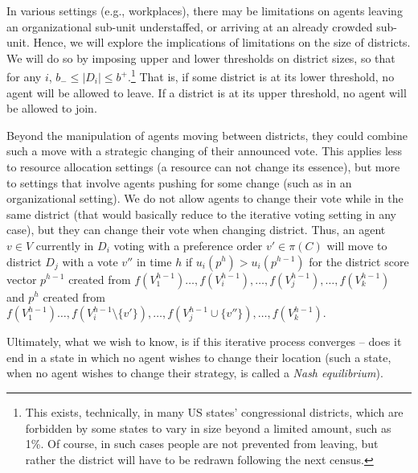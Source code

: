 \documentclass[letterpaper]{article} %
\begin{document}
In various settings (e.g., workplaces), there may be limitations on agents leaving an organizational sub-unit understaffed, or arriving at an already crowded sub-unit. Hence, we will explore the implications of limitations on the size of districts. We will do so by imposing upper and lower thresholds on district sizes, so that for any $i$, $b_{-}\leq |D_{i}|\leq b^{+}$.\footnote{This exists, technically, in many US states' congressional districts, which are forbidden by some states to vary in size beyond a limited amount, such as 1\%. Of course, in such cases people are not prevented from leaving, but rather the district will have to be redrawn following the next census.} That is, if some district is at its lower threshold, no agent will be allowed to leave. If a district is at its upper threshold, no agent will be allowed to join.

Beyond the manipulation of agents moving between districts, they could combine such a move with a strategic changing of their announced vote. This applies less to resource allocation settings (a resource can not change its essence), but more to settings that involve agents pushing for some change (such as in an organizational setting). We do not allow agents to change their vote while in the same district (that would basically reduce to the iterative voting setting in any case), but they can change their vote when changing district. Thus, an agent $v\in V$ currently in $D_{i}$ voting with a preference order $v'\in\pi(C)$ will move to district $D_{j}$ with a vote $v''$ in time $h$ if $u_{i}(p^h)>u_{i}(p^{h-1})$ for the district score vector $p^{h-1}$ created from
$f(V^{h-1}_{1})\ldots,f(V^{h-1}_{i}),\ldots,f (V^{h-1}_{j}),\ldots,f (V^{h-1}_{k})$ and $p^h$ created from
$f(V^{h-1}_{1})\ldots,f(V^{h-1}_{i}\setminus \{v'\}),\ldots,f (V^{h-1}_{j}\cup \{v''\}),\ldots,f (V^{h-1}_{k})$.

Ultimately, what we wish to know, is if this iterative process converges -- does it end in a state in which no agent wishes to change their location (such a state, when no agent wishes to change their strategy, is called a \emph{Nash equilibrium}).
\end{document}
